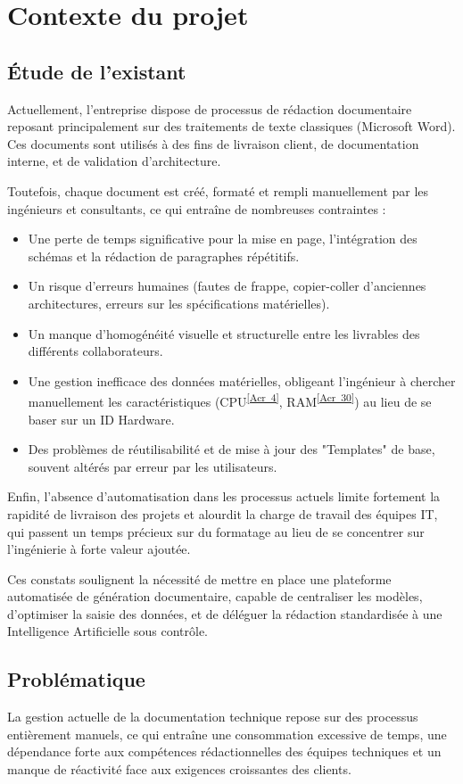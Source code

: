 \documentclass[12pt, a4paper]{report}
\newcommand{\acref}[1]{\textsuperscript{\hyperlink{acr:#1}{[Acr~#1]}}}
\begin{document}
\section{Contexte du projet}

\subsection{Étude de l’existant}
Actuellement, l’entreprise dispose de processus de rédaction documentaire reposant principalement sur des traitements de texte classiques (Microsoft Word). Ces documents sont utilisés à des fins de livraison client, de documentation interne, et de validation d'architecture.

Toutefois, chaque document est créé, formaté et rempli manuellement par les ingénieurs et consultants, ce qui entraîne de nombreuses contraintes :
\begin{itemize}
    \item Une perte de temps significative pour la mise en page, l'intégration des schémas et la rédaction de paragraphes répétitifs.
    \item Un risque d’erreurs humaines (fautes de frappe, copier-coller d'anciennes architectures, erreurs sur les spécifications matérielles).
    \item Un manque d'homogénéité visuelle et structurelle entre les livrables des différents collaborateurs.
    \item Une gestion inefficace des données matérielles, obligeant l'ingénieur à chercher manuellement les caractéristiques (CPU\acref{4}, RAM\acref{30}) au lieu de se baser sur un ID Hardware.
    \item Des problèmes de réutilisabilité et de mise à jour des "Templates" de base, souvent altérés par erreur par les utilisateurs.
\end{itemize}

Enfin, l’absence d’automatisation dans les processus actuels limite fortement la rapidité de livraison des projets et alourdit la charge de travail des équipes IT, qui passent un temps précieux sur du formatage au lieu de se concentrer sur l'ingénierie à forte valeur ajoutée.

Ces constats soulignent la nécessité de mettre en place une plateforme automatisée de génération documentaire, capable de centraliser les modèles, d'optimiser la saisie des données, et de déléguer la rédaction standardisée à une Intelligence Artificielle sous contrôle.

\subsection{Problématique}
La gestion actuelle de la documentation technique repose sur des processus entièrement manuels, ce qui entraîne une consommation excessive de temps, une dépendance forte aux compétences rédactionnelles des équipes techniques et un manque de réactivité face aux exigences croissantes des clients.
\end{document}
